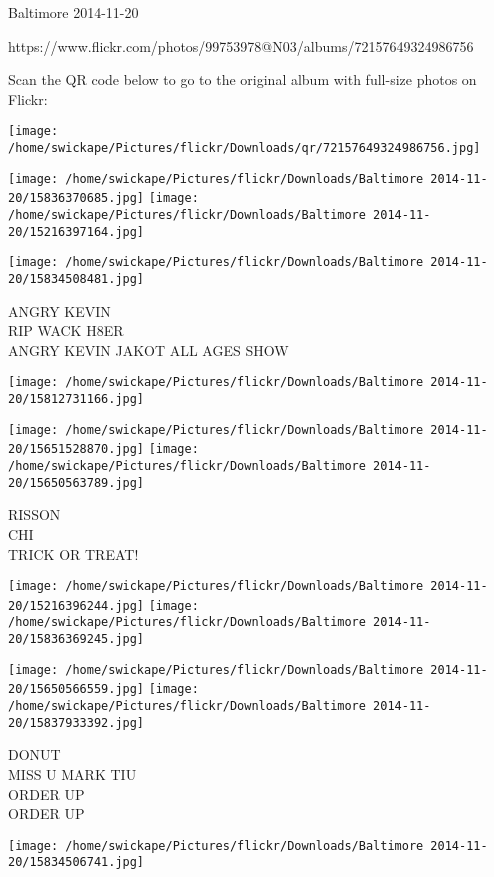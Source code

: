 \documentclass[10pt,letterpaper]{article}
\begin{document}
Baltimore 2014-11-20

https://www.flickr.com/photos/99753978@N03/albums/72157649324986756

Scan the QR code below to go to the original album with full-size photos on Flickr:

\texttt{[image: /home/swickape/Pictures/flickr/Downloads/qr/72157649324986756.jpg]}
\pagebreak

\texttt{[image: /home/swickape/Pictures/flickr/Downloads/Baltimore 2014-11-20/15836370685.jpg]}
\texttt{[image: /home/swickape/Pictures/flickr/Downloads/Baltimore 2014-11-20/15216397164.jpg]}

\texttt{[image: /home/swickape/Pictures/flickr/Downloads/Baltimore 2014-11-20/15834508481.jpg]}

ANGRY KEVIN\\
RIP WACK H8ER\\
ANGRY KEVIN JAKOT ALL AGES SHOW
\pagebreak

\texttt{[image: /home/swickape/Pictures/flickr/Downloads/Baltimore 2014-11-20/15812731166.jpg]}

\vspace{0.25in}
\texttt{[image: /home/swickape/Pictures/flickr/Downloads/Baltimore 2014-11-20/15651528870.jpg]}
\texttt{[image: /home/swickape/Pictures/flickr/Downloads/Baltimore 2014-11-20/15650563789.jpg]}

RISSON\\
CHI\\
TRICK OR TREAT!
\pagebreak

\texttt{[image: /home/swickape/Pictures/flickr/Downloads/Baltimore 2014-11-20/15216396244.jpg]}
\texttt{[image: /home/swickape/Pictures/flickr/Downloads/Baltimore 2014-11-20/15836369245.jpg]}

\texttt{[image: /home/swickape/Pictures/flickr/Downloads/Baltimore 2014-11-20/15650566559.jpg]}
\texttt{[image: /home/swickape/Pictures/flickr/Downloads/Baltimore 2014-11-20/15837933392.jpg]}

DONUT\\
MISS U MARK TIU\\
ORDER UP\\
ORDER UP
\pagebreak

\texttt{[image: /home/swickape/Pictures/flickr/Downloads/Baltimore 2014-11-20/15834506741.jpg]}
\end{document}
